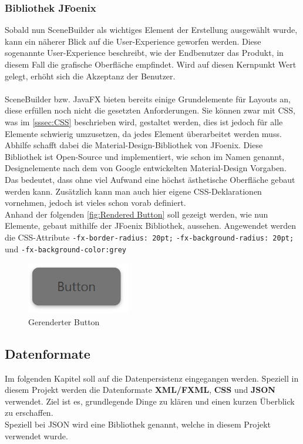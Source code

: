 \subsubsection{Bibliothek JFoenix}
Sobald nun SceneBuilder als wichtiges Element der Erstellung ausgewählt wurde, kann ein näherer Blick auf die User-Experience geworfen werden.
Diese sogenannte User-Experience beschreibt, wie der Endbenutzer das Produkt, in diesem Fall die grafische Oberfläche empfindet.
Wird auf diesen Kernpunkt Wert gelegt, erhöht sich die Akzeptanz der Benutzer.\\\\
SceneBuilder bzw. JavaFX bieten bereits einige Grundelemente für Layouts an, diese erfüllen noch nicht die gesetzten Anforderungen.
Sie können zwar mit CSS, was im \autoref{sssec:CSS} beschrieben wird, gestaltet werden, dies ist jedoch für alle Elemente schwierig umzusetzen, da jedes Element überarbeitet werden muss.
Abhilfe schafft dabei die Material-Design-Bibliothek von JFoenix.
Diese Bibliothek ist Open-Source und implementiert, wie schon im Namen genannt, Designelemente nach dem von Google entwickelten Material-Design Vorgaben.
Das bedeutet, dass ohne viel Aufwand eine höchst ästhetische Oberfläche gebaut werden kann.
Zusätzlich kann man auch hier eigene CSS-Deklarationen vornehmen, jedoch ist vieles schon vorab definiert.\\
Anhand der folgenden \autoref{fig:Rendered Button} soll gezeigt werden, wie nun Elemente, gebaut mithilfe der JFoenix Bibliothek, aussehen.
Angewendet werden die CSS-Attribute \lstinline{-fx-border-radius: 20pt;}  \lstinline{-fx-background-radius: 20pt;} und \lstinline{-fx-background-color:grey}
\begin{figure}[H]
    \centering
    \includegraphics[width=0.4\textwidth]{fig/ainf/RenderedButton.PNG}
    \caption{Gerenderter Button}
    \label{fig:Rendered Button}
\end{figure}
\subsection{Datenformate}\label{subsec:datenformate-in-java-fx}
Im folgenden Kapitel soll auf die Datenpersistenz eingegangen werden.
Speziell in diesem Projekt werden die Datenformate \textbf{XML/FXML}, \textbf{CSS} und \textbf{\acs{JSON}} verwendet.
Ziel ist es, grundlegende Dinge zu klären und einen kurzen Überblick zu erschaffen.\\
Speziell bei JSON wird eine Bibliothek genannt, welche in diesem Projekt verwendet wurde.
